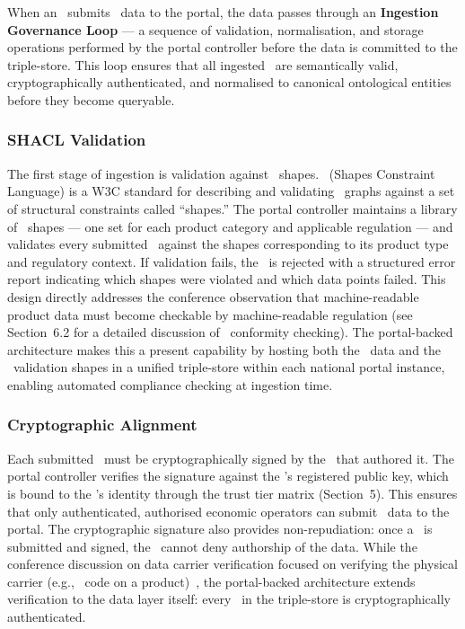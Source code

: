 When an \REO\ submits \DPP\ data to the portal, the data passes through an
\textbf{Ingestion Governance Loop} --- a sequence of validation, normalisation,
and storage operations performed by the portal controller before the data is
committed to the triple-store. This loop ensures that all ingested \DPPs\ are
semantically valid, cryptographically authenticated, and normalised to canonical
ontological entities before they become queryable.

\subsubsection{SHACL Validation}

The first stage of ingestion is validation against \SHACL\ shapes. \SHACL\
(Shapes Constraint Language) is a W3C standard for describing and validating
\RDF\ graphs against a set of structural constraints called ``shapes.'' The
portal controller maintains a library of \SHACL\ shapes --- one set for each
product category and applicable regulation --- and validates every submitted
\DPP\ against the shapes corresponding to its product type and regulatory
context. If validation fails, the \DPP\ is rejected with a structured error
report indicating which shapes were violated and which data points failed.
This design directly addresses the conference observation that machine-readable
product data must become checkable by machine-readable regulation (see
Section~6.2 for a detailed discussion of \SHACL\ conformity checking).
The portal-backed architecture makes this a present capability by hosting both
the \DPP\ data and the \SHACL\ validation shapes in a unified triple-store
within each national portal instance, enabling automated compliance checking at
ingestion time.

\subsubsection{Cryptographic Alignment}

Each submitted \DPP\ must be cryptographically signed by the \REO\ that authored
it. The portal controller verifies the signature against the \REO's registered
public key, which is bound to the \REO's identity through the trust tier matrix
(Section~5). This ensures that only authenticated, authorised economic operators
can submit \DPP\ data to the portal. The cryptographic signature also provides
non-repudiation: once a \DPP\ is submitted and signed, the \REO\ cannot deny
authorship of the data. While the conference discussion on data carrier
verification focused on verifying the physical carrier (e.g., \QR\ code on a
product)~\cite{dpp4eu2026_day1}, the portal-backed architecture extends
verification to the data layer itself: every \DPP\ in the triple-store is
cryptographically authenticated.

